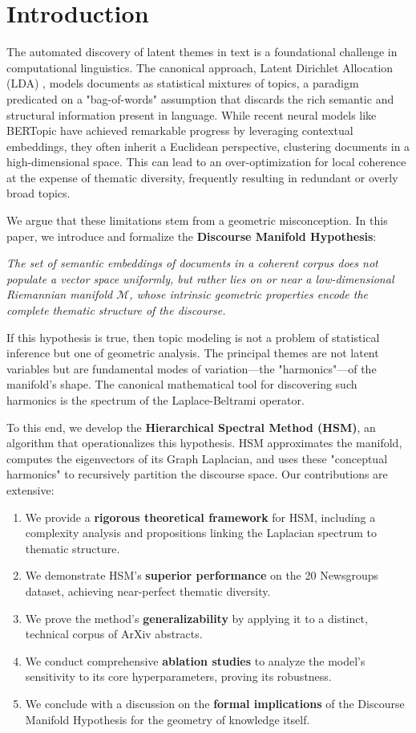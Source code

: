 \documentclass[conference]{IEEEtran}
\theoremstyle{definition}
\begin{document}
\section{Introduction}
The automated discovery of latent themes in text is a foundational challenge in computational linguistics. The canonical approach, Latent Dirichlet Allocation (LDA) \cite{blei2003latent}, models documents as statistical mixtures of topics, a paradigm predicated on a "bag-of-words" assumption that discards the rich semantic and structural information present in language. While recent neural models like BERTopic \cite{grootendorst2022bertopic} have achieved remarkable progress by leveraging contextual embeddings, they often inherit a Euclidean perspective, clustering documents in a high-dimensional space. This can lead to an over-optimization for local coherence at the expense of thematic diversity, frequently resulting in redundant or overly broad topics.

We argue that these limitations stem from a geometric misconception. In this paper, we introduce and formalize the \textbf{Discourse Manifold Hypothesis}:
\begin{center}
\textit{The set of semantic embeddings of documents in a coherent corpus does not populate a vector space uniformly, but rather lies on or near a low-dimensional Riemannian manifold $\mathcal{M}$, whose intrinsic geometric properties encode the complete thematic structure of the discourse.}
\end{center}
If this hypothesis is true, then topic modeling is not a problem of statistical inference but one of geometric analysis. The principal themes are not latent variables but are fundamental modes of variation—the "harmonics"—of the manifold's shape. The canonical mathematical tool for discovering such harmonics is the spectrum of the Laplace-Beltrami operator.

To this end, we develop the \textbf{Hierarchical Spectral Method (HSM)}, an algorithm that operationalizes this hypothesis. HSM approximates the manifold, computes the eigenvectors of its Graph Laplacian, and uses these "conceptual harmonics" to recursively partition the discourse space. Our contributions are extensive:
\begin{enumerate}
    \item We provide a \textbf{rigorous theoretical framework} for HSM, including a complexity analysis and propositions linking the Laplacian spectrum to thematic structure.
    \item We demonstrate HSM's \textbf{superior performance} on the 20 Newsgroups dataset, achieving near-perfect thematic diversity.
    \item We prove the method's \textbf{generalizability} by applying it to a distinct, technical corpus of ArXiv abstracts.
    \item We conduct comprehensive \textbf{ablation studies} to analyze the model's sensitivity to its core hyperparameters, proving its robustness.
    \item We conclude with a discussion on the \textbf{formal implications} of the Discourse Manifold Hypothesis for the geometry of knowledge itself.
\end{enumerate}
\end{document}
